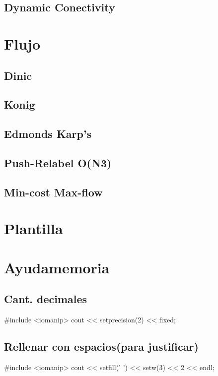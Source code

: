 \subsection{Dynamic Conectivity}


\section{Flujo}%
\subsection{Dinic}
\subsection{Konig}
\subsection{Edmonds Karp's}
\subsection{Push-Relabel O(N3)}
\subsection{Min-cost Max-flow}


\section{Plantilla}%


\section{Ayudamemoria}%
\subsection*{Cant. decimales}
\begin{code}
#include <iomanip>
cout << setprecision(2) << fixed;
\end{code}
\subsection*{Rellenar con espacios(para justificar)}
\begin{code}
#include <iomanip>
cout << setfill(' ') << setw(3) << 2 << endl;
\end{code}

